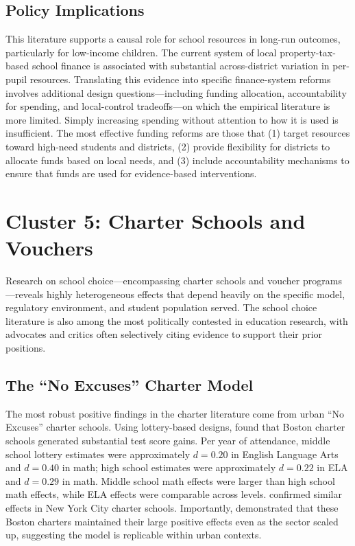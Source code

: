 \documentclass[12pt,letterpaper]{article}
\begin{document}
\subsection{Policy Implications}

This literature supports a causal role for school resources in long-run outcomes, particularly for low-income children. The current system of local property-tax-based school finance is associated with substantial across-district variation in per-pupil resources. Translating this evidence into specific finance-system reforms involves additional design questions---including funding allocation, accountability for spending, and local-control tradeoffs---on which the empirical literature is more limited. Simply increasing spending without attention to how it is used is insufficient. The most effective funding reforms are those that (1) target resources toward high-need students and districts, (2) provide flexibility for districts to allocate funds based on local needs, and (3) include accountability mechanisms to ensure that funds are used for evidence-based interventions.

\section{Cluster 5: Charter Schools and Vouchers}

Research on school choice---encompassing charter schools and voucher programs---reveals highly heterogeneous effects that depend heavily on the specific model, regulatory environment, and student population served. The school choice literature is also among the most politically contested in education research, with advocates and critics often selectively citing evidence to support their prior positions.

\subsection{The ``No Excuses'' Charter Model}

The most robust positive findings in the charter literature come from urban ``No Excuses'' charter schools. Using lottery-based designs, \citet{angrist2013} found that Boston charter schools generated substantial test score gains. Per year of attendance, middle school lottery estimates were approximately $d = 0.20$ in English Language Arts and $d = 0.40$ in math; high school estimates were approximately $d = 0.22$ in ELA and $d = 0.29$ in math. Middle school math effects were larger than high school math effects, while ELA effects were comparable across levels. \citet{abdulkadirolu2016} confirmed similar effects in New York City charter schools. Importantly, \citet{cohodes2021} demonstrated that these Boston charters maintained their large positive effects even as the sector scaled up, suggesting the model is replicable within urban contexts.
\end{document}
